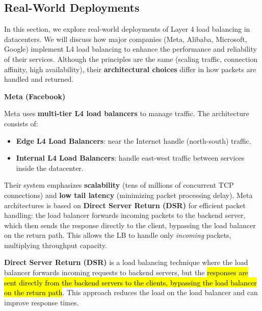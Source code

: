 \subsection{Real-World Deployments}

In this section, we explore real-world deployments of Layer 4 load balancing in datacenters. We will discuss how major companies (Meta, Alibaba, Microsoft, Google) implement L4 load balancing to enhance the performance and reliability of their services. Although the principles are the same (scaling traffic, connection affinity, high availability), their \textbf{architectural choices} differ in how packets are handled and returned.

\highspace
\begin{flushleft}
    \textcolor{Green3}{ \textbf{Meta (Facebook)}}
\end{flushleft}
Meta uses \textbf{multi-tier L4 load balancers} to manage traffic. The architecture consists of:
\begin{itemize}
    \item \textbf{Edge L4 Load Balancers}: near the Internet handle (north-south) traffic.
    \item \textbf{Internal L4 Load Balancers}: handle east-west traffic between services inside the datacenter.
\end{itemize}
Their system emphasizes \textbf{scalability} (tens of millions of concurrent TCP connections) and \textbf{low tail latency} (minimizing packet processing delay). Meta architectures is based on \textbf{Direct Server Return (DSR)} for efficient packet handling: the load balancer forwards incoming packets to the backend server, which then sends the response directly to the client, bypassing the load balancer on the return path. This allows the LB to handle only \emph{incoming} packets, multiplying throughput capacity.

\highspace
\begin{definitionbox}\label{definition: Direct Server Return (DSR)}
    \textbf{Direct Server Return (DSR)} is a load balancing technique where the load balancer forwards incoming requests to backend servers, but the \hl{responses are sent directly from the backend servers to the clients, bypassing the load balancer on the return path}. This approach reduces the load on the load balancer and can improve response times.
\end{definitionbox}

